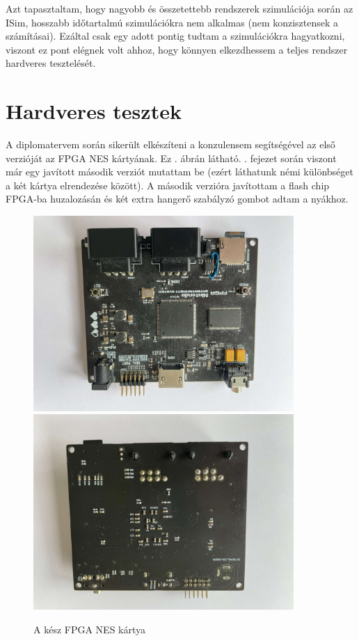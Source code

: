 Azt tapasztaltam, hogy nagyobb és összetettebb rendszerek szimulációja során az ISim, hosszabb időtartalmú szimulációkra nem alkalmas (nem konzisztensek a számításai). Ezáltal csak egy adott pontig tudtam a szimulációkra hagyatkozni, viszont ez pont elégnek volt ahhoz, hogy könnyen elkezdhessem a teljes rendszer hardveres tesztelését.  

\newpage
\section{Hardveres tesztek}

A diplomatervem során sikerült elkészíteni a konzulensem segítségével az első verzióját az FPGA NES kártyának. Ez . ábrán látható. . fejezet során viszont már egy javított második verziót mutattam be (ezért láthatunk némi különbséget a két kártya elrendezése között). A második verzióra javítottam a flash chip FPGA-ba huzalozásán és két extra hangerő szabályzó gombot adtam a nyákhoz.

\begin{figure}[H]
	\centering
	\includegraphics[width=99mm, keepaspectratio, angle=90]{figures/nes-pcb-assembled-top}
	\includegraphics[width=99mm, keepaspectratio, angle=90]{figures/nes-pcb-assembled-botom}
	\caption{A kész FPGA NES kártya} 
	\label{fig:PCB-Assembled}
\end{figure}

